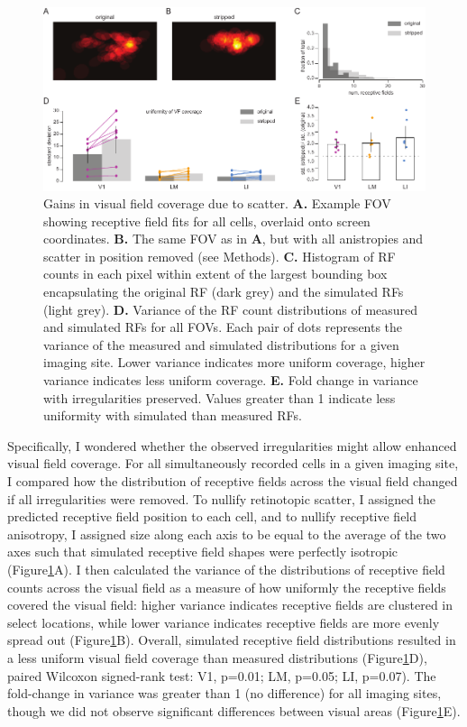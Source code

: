 \begin{figure}[t!]
    \includegraphics[width=\textwidth]{figures/chapter_3/fig_3-6_vf_coverage/fig_3-6_vf_coverage.pdf}
    \vspace{.1in}
    \caption[Compensatory visual field coverage]{Gains in visual field coverage due to scatter. 
    \textbf{A.} Example FOV showing receptive field fits for all cells, overlaid onto screen coordinates.
    \textbf{B.} The same FOV as in \textbf{A}, but with all anistropies and scatter in position removed (see Methods). 
    \textbf{C.} Histogram of RF counts in each pixel within extent of the largest bounding box encapsulating the original RF (dark grey) and the simulated RFs (light grey).
    \textbf{D.} Variance of the RF count distributions of measured and simulated RFs for all FOVs. Each pair of dots represents the variance of the measured and simulated distributions for a given imaging site. Lower variance indicates more uniform coverage, higher variance indicates less uniform coverage.
    \textbf{E.} Fold change in variance with irregularities preserved. Values greater than 1 indicate less uniformity with simulated than measured RFs.
    \label{fig:vf_coverage}}
\end{figure}

Specifically, I wondered whether the observed irregularities might allow enhanced visual field coverage. For all simultaneously recorded cells in a given imaging site, I compared how the distribution of receptive fields across the visual field changed if all irregularities were removed. To nullify retinotopic scatter, I assigned the predicted receptive field position to each cell, and to nullify receptive field anisotropy, I assigned size along each axis to be equal to the average of the two axes such that simulated receptive field shapes were perfectly isotropic (Figure\ref{fig:vf_coverage}A). I then calculated the variance of the distributions of receptive field counts across the visual field as a measure of how uniformly the receptive fields covered the visual field:  higher variance indicates receptive fields are clustered in select locations, while lower variance indicates receptive fields are more evenly spread out (Figure\ref{fig:vf_coverage}B). Overall, simulated receptive field distributions resulted in a less uniform visual field coverage than measured distributions (Figure\ref{fig:vf_coverage}D), paired Wilcoxon signed-rank test: V1, p=0.01; LM, p=0.05; LI, p=0.07). The fold-change in variance was greater than 1 (no difference) for all imaging sites, though we did not observe significant differences between visual areas (Figure\ref{fig:vf_coverage}E). 


